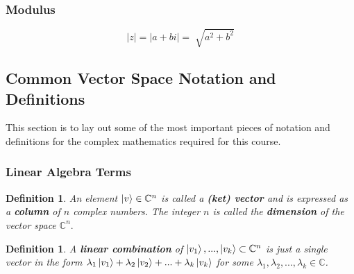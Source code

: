 \documentclass[12pt]{article}
\theoremstyle{plain}
\theoremstyle{nonumberplain}
\theoremstyle{plain}
\newtheorem{definition}[lemma]{Definition}
\theoremstyle{nonumberplain}
\newcommand\1{{\bf 1}}
\newcommand{\C}{\mathbb{C}} %
\newcommand{\<}{\left\langle}
\renewcommand{\>}{\right\rangle}
\begin{document}
\subsubsection{Modulus}	
\begin{equation}
|z| = |a + bi| = \sqrt[]{a^2 + b^2} 
\end{equation}
		
	
		
\subsection{Common Vector Space Notation and Definitions}
This section is to lay out some of the most important pieces of notation and definitions for the complex mathematics required for this course.  
\subsubsection{Linear Algebra Terms}
\begin{definition}
An element $\ket{v}\in \C^n$ is called a \textbf{(ket) vector} and is expressed as a \textbf{column} of $n$ complex numbers. The integer $n$ is called the \textbf{dimension} of the vector space $\C^n.$
\end{definition}

\begin{definition}
A \textbf{linear combination} of ${\ket{v_1}, ... , \ket{v_k}} \subset \C^n$ is just a single vector in the form $\lambda_1\ket{v_1} + \lambda_2\ket{v_2} + ... + \lambda_k\ket{v_k}$ for some $\lambda_1, \lambda_2, ..., \lambda_k  \in \C$.
\label{def:Combination}
\end{definition}
\end{document}
